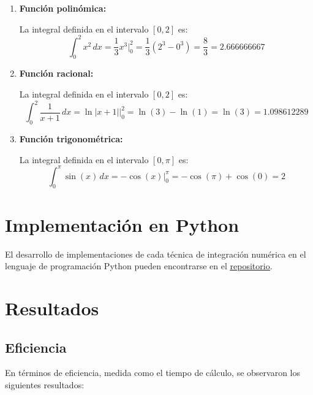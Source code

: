 \documentclass[a4paper]{article}
\begin{document}
    \begin{enumerate}
        \item \textbf{Función polinómica:}
        
        La integral definida en el intervalo \( [0, 2] \) es:
        \begin{equation}
        \int_{0}^{2} x^2 \, dx = \frac{1}{3}x^3 \Big|_{0}^{2} = \frac{1}{3}(2^3 - 0^3) = \frac{8}{3} = 2.666666667
        \end{equation}
    
        \item \textbf{Función racional:}
        
        La integral definida en el intervalo \( [0, 2] \) es:
        \begin{equation}
        \int_{0}^{2} \frac{1}{x + 1} \,dx = \ln|x + 1| \Big|_{0}^{2} = \ln(3) - \ln(1) = \ln(3) = 1.098612289
        \end{equation}
    
        \item \textbf{Función trigonométrica:}
        
        La integral definida en el intervalo \( [0, \pi] \) es:
        \begin{equation}
        \int_{0}^{\pi} \sin(x) \, dx = -\cos(x) \Big|_{0}^{\pi} = -\cos(\pi) + \cos(0) = 2
        \end{equation}
    \end{enumerate}

    
    \section{Implementación en Python}
	\label{sec:python}
    El desarrollo de implementaciones de cada técnica de integración numérica en el lenguaje de 
    programación Python pueden encontrarse en el  \underline{\href{https://github.com/nicolasgomeza7/tecnicasIntegracion}{repositorio}}.

    
    \section{Resultados}    
    \subsection{Eficiencia}
    
    En términos de eficiencia, medida como el tiempo de cálculo, se observaron los siguientes 
    resultados:
    
\end{document}
